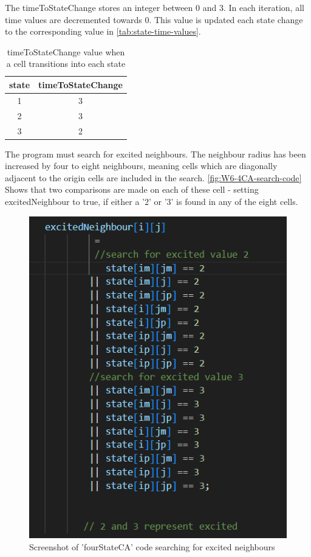 The timeToStateChange stores an integer between 0 and 3. In each iteration, all time values are decremented towards 0. This value is updated each state change to the corresponding value in \autoref{tab:state-time-values}.

\begin{table}[htbp]
  \centering
  \renewcommand{\arraystretch}{1.2}
  \begin{tabular}{|c|c|}
    \hline
    \textbf{state} & \textbf{timeToStateChange} \\

    \hline
    1 & 3 \\
    \hline
    2 & 3 \\
    \hline
    3 & 2 \\
    \hline
  \end{tabular}
  \caption{timeToStateChange value when a cell transitions into each state}
  \label{tab:state-time-values}
\end{table}


The program must search for excited neighbours. The neighbour radius has been increased by four to eight neighbours, meaning cells which are diagonally adjacent to the origin cells are included in the search. \autoref{fig:W6-4CA-search-code} Shows that two comparisons are made on each of these cell - setting excitedNeighbour to true, if either a '2' or '3' is found in any of the eight cells. 
\begin{figure}[H] 
    \centering
    \includegraphics[width=1\columnwidth]{Figures/Week 6/4stateCA-neighbour-search-code.png}
    \caption{Screenshot of 'fourStateCA' code searching for excited neighbours}
    \label{fig:W6-4CA-search-code}
\end{figure}

